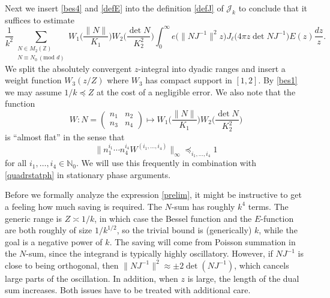 \documentclass[11pt]{amsart}
\numberwithin{equation}{section}
\theoremstyle{plain}
\theoremstyle{definition}
\numberwithin{equation}{section}
\begin{document}
Next we insert \eqref{bes4} and \eqref{defE} into the definition \eqref{defJ} of $\mathcal{J}_k$ to conclude that it suffices to estimate
\begin{equation}\label{prelim}
\frac{1}{k^2}  \sum_{\substack{N \in   M_2(\mathbb{Z})\\ N \equiv N_0\, (\text{mod } d)}}  W_1\Big(\frac{\| N \|}{K_1}\Big) W_2\Big(\frac{\det N}{K_2^2}\Big)    \int_0^{\infty} e\big(\| N J^{-1}\|^2 z \big) J_{\ell}\big(4\pi z  \det NJ^{-1}\big) E(z) \frac{dz}{z}. 
\end{equation}
      We split the absolutely convergent $z$-integral into dyadic ranges and insert a weight function $W_3(z/Z)$ where $W_3$ has compact support in $[1, 2]$. By \eqref{bes1} we may assume $1/k \preccurlyeq Z$  at the cost of a negligible error. We also note that the function $$W : N = \left(\begin{matrix} n_1 & n_2 \\ n_3 & n_4\end{matrix}\right)\mapsto W_1\Big(\frac{\| N \|}{K_1}\Big) W_2\Big(\frac{\det N}{K_2^2}\Big) $$
  is ``almost flat'' in the sense that
\begin{equation}\label{flat}
 \| n_1^{i_1} \cdots n_4^{i_4} W^{(i_1, \ldots, i_4)} \|_{\infty} \preccurlyeq_{i_1, \ldots, i_4} 1
 \end{equation}
  for all $i_1, \ldots, i_4 \in \mathbb{N}_0$. We will use this frequently in combination with \eqref{quadrstatph} in stationary phase arguments. 
 
 Before we formally analyze the expression \eqref{prelim}, it might be instructive to get a feeling how much saving is required.     The $N$-sum has roughly $k^4$ terms. The generic range is $Z \asymp 1/k$, in which case the Bessel function and the $E$-function are both roughly of size $1/k^{1/2}$, so the trivial bound is (generically) $k$, while the goal is a negative power of $k$. The saving will come from Poisson summation in the $N$-sum, since the integrand is typically highly oscillatory. However, if $NJ^{-1}$ is close to being orthogonal, then $\| N J^{-1}\|^2 \approx \pm 2 \det(NJ^{-1})$, which cancels large parts of the oscillation. In addition, when $z$ is large, the length of the dual sum increases. Both issues have to be treated with  additional care. 
       
 
\end{document}
